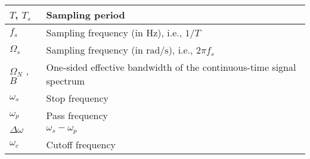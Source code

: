 \documentclass{article}
\begin{document}
\begin{xltabular}{\textwidth}{XX}
	\(T\)\cite{oppenheimDiscreteTimeSignalProcessing2009}, \(T_s\)                                  & Sampling period                                                                                                                                                                                             \\ \hline
	\(f_s\)                                                                                         & Sampling frequency (in \(\si{\hertz}\)), i.e., \(1/T\)                                                                                                                                                      \\ \hline
	\(\Omega_s\)                                                                                    & Sampling frequency (in \(\si{\radian\per\second}\)), i.e., \(2\pi f_s\)                                                                                                                                     \\ \hline
	\(\Omega_N\) \cite{oppenheimDiscreteTimeSignalProcessing2009}, \(B\)                            & One-sided effective bandwidth of the continuous-time signal spectrum                                                                                                                                        \\ \hline
	\(\omega_s\)                                                                                    & Stop frequency \cite{ingleDigitalSignalProcessing2000}                                                                                                                                                      \\ \hline
	\(\omega_p\)                                                                                    & Pass frequency \cite{ingleDigitalSignalProcessing2000}                                                                                                                                                      \\ \hline
	\(\Delta \omega\)                                                                               & \(\omega_s - \omega_p\) \cite{ingleDigitalSignalProcessing2000}                                                                                                                                             \\ \hline
	\(\omega_c\)                                                                                    & Cutoff frequency \cite{ingleDigitalSignalProcessing2000}                                                                                                                                                    \\ \hline

\end{xltabular}
\end{document}
